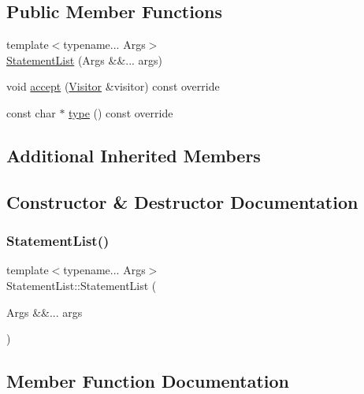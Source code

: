\subsection*{Public Member Functions}
\begin{DoxyCompactItemize}
\item 
{\footnotesize template$<$typename... Args$>$ }\\\hyperlink{struct_statement_list_a9e3154be364d96ab840141257183b204}{Statement\+List} (Args \&\&... args)
\item 
void \hyperlink{struct_statement_list_a793dafb939f4a4163bc37e0a2f7bf2bf}{accept} (\hyperlink{struct_visitor}{Visitor} \&visitor) const override
\item 
const char $\ast$ \hyperlink{struct_statement_list_a720038f01e820f043e7f16e4acc7a0f9}{type} () const override
\end{DoxyCompactItemize}
\subsection*{Additional Inherited Members}


\subsection{Constructor \& Destructor Documentation}
\mbox{\label{struct_statement_list_a9e3154be364d96ab840141257183b204}} 
\subsubsection{\texorpdfstring{Statement\+List()}{StatementList()}}
{\footnotesize\ttfamily template$<$typename... Args$>$ \\
Statement\+List\+::\+Statement\+List (\begin{DoxyParamCaption}\item[{Args \&\&...}]{args }\end{DoxyParamCaption})\hspace{0.3cm}{\ttfamily [inline]}}



\subsection{Member Function Documentation}
\mbox{\label{struct_statement_list_a793dafb939f4a4163bc37e0a2f7bf2bf}} 
